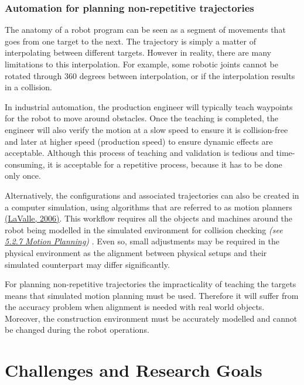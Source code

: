 \documentclass[11pt]{book}
\begin{document}
\subsubsection{Automation for planning non-repetitive trajectories}

The anatomy of a robot program can be seen as a segment of movements that goes from one target to the next. The trajectory is simply a matter of interpolating between different targets. However in reality, there are many limitations to this interpolation. For example, some robotic joints cannot be rotated through 360 degrees between interpolation, or if the interpolation results in a collision.

In industrial automation, the production engineer will typically teach waypoints for the robot to move around obstacles. Once the teaching is completed, the engineer will also verify the motion at a slow speed to ensure it is collision-free and later at higher speed (production speed) to ensure dynamic effects are acceptable. Although this process of teaching and validation is tedious and time-consuming, it is acceptable for a repetitive process, because it has to be done only once. 

Alternatively, the configurations and associated trajectories can also be created in a computer simulation, using algorithms that are referred to as motion planners \href{https://www.zotero.org/google-docs/?016btu}{(LaValle, 2006)}. This workflow requires all the objects and machines around the robot being modelled in the simulated environment for collision checking \textit{(see \uline{5.2.7 Motion Planning})} . Even so, small adjustments may be required in the physical environment as the alignment between physical setups and their simulated counterpart may differ significantly.

For planning non-repetitive trajectories the impracticality of teaching the targets means that simulated motion planning must be used. Therefore it will suffer from the accuracy problem when alignment is needed with real world objects. Moreover, the construction environment must be accurately modelled and cannot be changed during the robot operations. 

\vspace{1\baselineskip}

\newpage

\section{Challenges and Research Goals}
\end{document}
